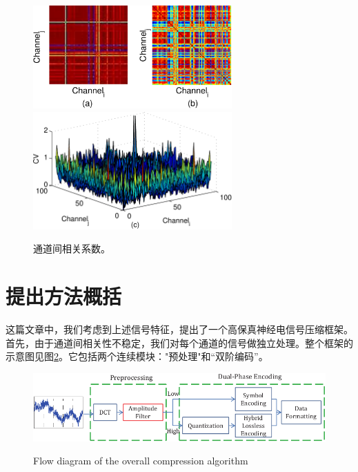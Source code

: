 \begin{enumerate}
\begin{figure}
  \centering
  \includegraphics[width=3in]{Pictures/Compression/f3(ab)-crop.pdf}\\
  \includegraphics[width=3in]{Pictures/Compression/f3(c)-crop.pdf}\\
  \caption{通道间相关系数。 }\label{fig:Characteristic3}
\end{figure}

\end{enumerate}



\section{提出方法概括}
这篇文章中，我们考虑到上述信号特征，提出了一个高保真神经电信号压缩框架。首先，由于通道间相关性不稳定，我们对每个通道的信号做独立处理。整个框架的示意图见图\ref{Fig:Compression Algorithm Diagram}。它包括两个连续模块："预处理"和“双阶编码”。

\begin{figure}
  \centering
  \includegraphics{Pictures/Compression/f4test1-crop.pdf}\\
  \caption{Flow diagram of the overall compression algorithm}\label{Fig:Compression Algorithm Diagram}
\end{figure}

